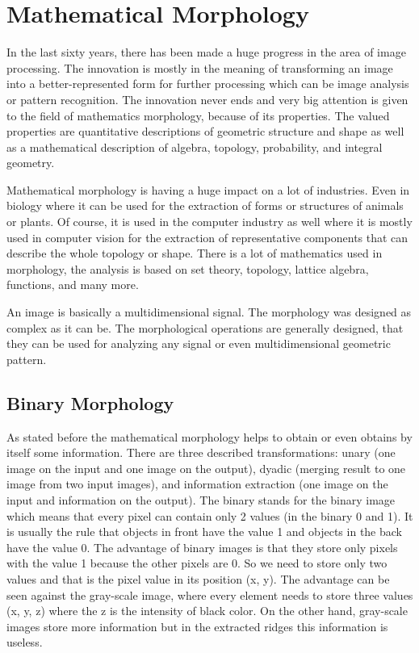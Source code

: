 \section{Mathematical Morphology}
In the last sixty years, there has been made a huge progress in the area of image processing. The innovation is mostly in the meaning of transforming an image into a better-represented form for further processing which can be image analysis or pattern recognition. The innovation never ends and very big attention is given to the field of mathematics morphology, because of its properties. The valued properties are quantitative descriptions of geometric structure and shape as well as a mathematical description of algebra, topology, probability, and integral geometry. \cite{morphilogy2} \cite{shih2009image}

Mathematical morphology is having a huge impact on a lot of industries. Even in biology where it can be used for the extraction of forms or structures of animals or plants. Of course, it is used in the computer industry as well where it is mostly used in computer vision for the extraction of representative components that can describe the whole topology or shape. There is a lot of mathematics used in morphology, the analysis is based on set theory, topology, lattice algebra, functions, and many more. \cite{morphilogy2} \cite{shih2009image}

An image is basically a multidimensional signal. The morphology was designed as complex as it can be. The morphological operations are generally designed, that they can be used for analyzing any signal or even multidimensional geometric pattern. \cite{morphilogy2} \cite{shih2009image}

\subsection{Binary Morphology}
As stated before the mathematical morphology helps to obtain or even obtains by itself some information. There are three described transformations: unary (one image on the input and one image on the output), dyadic (merging result to one image from two input images), and information extraction (one image on the input and information on the output). The binary stands for the binary image which means that every pixel can contain only 2 values (in the binary 0 and 1). It is usually the rule that objects in front have the value 1 and objects in the back have the value 0. The advantage of binary images is that they store only pixels with the value 1 because the other pixels are 0. So we need to store only two values and that is the pixel value in its position (x, y). The advantage can be seen against the gray-scale image, where every element needs to store three values (x, y, z) where the z is the intensity of black color. On the other hand, gray-scale images store more information but in the extracted ridges this information is useless. \cite{shih2009image}

